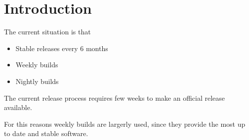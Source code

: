 \section{Introduction} \label{sec:intro}

The current situation is  that
\begin{itemize}
\item Stable releases every 6 months
\item Weekly builds
\item Nightly builds
\end{itemize}

The current release process requires few weeks to make an official release available.

For this reasons weekly builds are largerly used, since they provide the most up to date and stable software.


